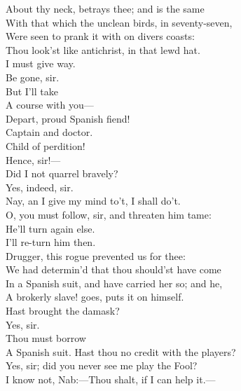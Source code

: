 \documentclass[a4paper,oneside]{memoir}
\begin{document}
\begin{drama*}
About thy neck, betrays thee; and is the same\\
With that which the unclean birds, in seventy-seven,\\
Were seen to prank it with on divers coasts:\\
Thou look'st like antichrist, in that lewd hat.\\
\surlyspeaks I must give way.\\
\kastrilspeaks {} Be gone, sir.\\
\surlyspeaks {} But I'll take\\
A course with you---\\
\ananiasspeaks {} Depart, proud Spanish fiend!\\
\surlyspeaks Captain and doctor.\\
\ananiasspeaks {} Child of perdition!\\
\kastrilspeaks Hence, sir!---\\
Did I not quarrel bravely?\\
\facespeaks {} Yes, indeed, sir.\\
\kastrilspeaks Nay, an I give my mind to't, I shall do't.\\
\facespeaks O, you must follow, sir, and threaten him tame:\\
He'll turn again else.\\
\kastrilspeaks {} I'll re-turn him then.\\
\facespeaks Drugger, this rogue prevented us for thee:\\
We had determin'd that thou should'st have come\\
In a Spanish suit, and have carried her so; and he,\\
A brokerly slave! goes, puts it on himself.\\
Hast brought the damask?\\
\druggerspeaks {} Yes, sir.\\
\facespeaks {} Thou must borrow\\
A Spanish suit. Hast thou no credit with the players?\\
\druggerspeaks Yes, sir; did you never see me play the Fool?\\
\facespeaks I know not, Nab:---Thou shalt, if I can help it.---\\

\end{drama*}
\end{document}
